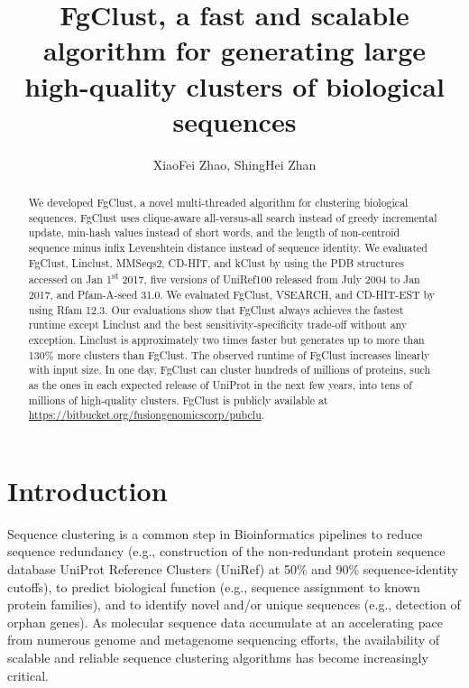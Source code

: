 \documentclass[11pt,letterpaper]{article}
\title{FgClust, a fast and scalable algorithm for generating large high-quality clusters of biological sequences}
\author{XiaoFei Zhao, ShingHei Zhan}
\begin{document}
\maketitle

\begin{abstract}
We developed FgClust, a novel multi-threaded algorithm for clustering biological sequences.
FgClust uses clique-aware all-versus-all search instead of greedy incremental update, min-hash values instead of short words, and the length of non-centroid sequence minus infix Levenshtein distance instead of sequence identity.
We evaluated FgClust, Linclust, MMSeqs2, CD-HIT, and kClust by using the PDB structures accessed on Jan 1\textsuperscript{st} 2017, five versions of UniRef100 released from July 2004 to Jan 2017, and Pfam-A-seed 31.0.
We evaluated FgClust, VSEARCH, and CD-HIT-EST by using Rfam 12.3.
Our evaluations show that FgClust always achieves the fastest runtime except Linclust and the best sensitivity-specificity trade-off without any exception.
Linclust is approximately two times faster but generates up to more than 130\% more clusters than FgClust.
The observed runtime of FgClust increases linearly with input size.
In one day, FgClust can cluster hundreds of millions of proteins, such as the ones in each expected release of UniProt in the next few years, into tens of millions of high-quality clusters.
FgClust is publicly available at \url{https://bitbucket.org/fusiongenomicscorp/pubclu}.
\end{abstract}

\section{Introduction}

Sequence clustering is a common step in Bioinformatics pipelines to reduce sequence redundancy (e.g., construction of the non-redundant protein sequence database UniProt Reference Clusters (UniRef) at 50\% and 90\% sequence-identity cutoffs), to predict biological function (e.g., sequence assignment to known protein families), and to identify novel and/or unique sequences (e.g., detection of orphan genes). As molecular sequence data accumulate at an accelerating pace from numerous genome and metagenome sequencing efforts, the availability of scalable and reliable sequence clustering algorithms has become increasingly critical.

\end{document}
